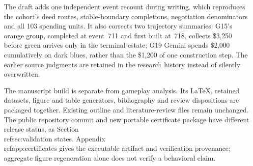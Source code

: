 The draft adds one independent event recount during writing, which reproduces the cohort's deed routes, stable-boundary completions, negotiation denominators and all 103 spending units. It also corrects two trajectory summaries: G15's orange group, completed at event~711 and first built at~718, collects \$3,250 before green arrives only in the terminal estate; G19 Gemini spends \$2,000 cumulatively on dark blues, rather than the \$1,200 of one construction step. The earlier source judgments are retained in the research history instead of silently overwritten.

The manuscript build is separate from gameplay analysis. Its LaTeX, retained datasets, figure and table generators, bibliography and review dispositions are packaged together. Existing outline and literature-review files remain unchanged. The public repository commit and new portable certificate package have different release status, as Section~\\ref{sec:validation} states. Appendix~\\ref{app:certificates} gives the executable artifact and verification provenance; aggregate figure regeneration alone does not verify a behavioral claim.

